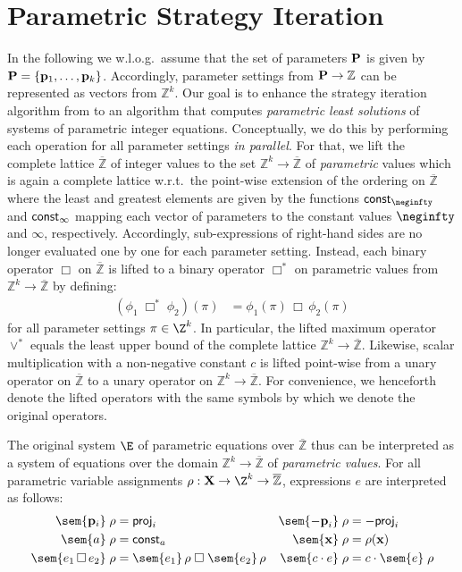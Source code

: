 \documentclass[a4paper]{easychair}
\newcommand{\ZZ}{\mathbb{Z}}
\newcommand{\ZzZ}{\overline{\mathbb Z}}
\newcommand{\us}{\cite{Gawlitza07PreciseFix,DBLP:conf/fm/GawlitzaS08,EasyChair:235}\xspace}
\begin{document}
\section{Parametric Strategy Iteration}\label{s:psi}

In the following we w.l.o.g.\ assume that the set of parameters ${\bf P}$ is given by 
${\bf P} = \{{\bf p}_1,\ldots,{\bf p}_k\}$. 
Accordingly, parameter settings from ${\bf P}\to\ZZ$
can be represented as vectors from $\ZZ^k$.
Our goal is to enhance the strategy iteration algorithm from \us 
to an algorithm 
that computes \emph{parametric least solutions} of systems of parametric integer equations.
Conceptually, we do this by performing each operation for all parameter settings \emph{in parallel}.
For that, we lift the complete lattice $\ZzZ$ of integer values to the set $\ZZ^k\to\ZzZ$
of \emph{parametric} values which is again a complete lattice w.r.t.\
the point-wise extension of the ordering on $\ZzZ$
where the least and greatest elements are given by the functions ${\sf const}_{\neginfty}$ and
${\sf const}_\infty$ mapping each vector of parameters to the constant values $\neginfty$ and $\infty$, respectively.
Accordingly, sub-expressions of right-hand sides are no longer evaluated one by one for each parameter setting.
Instead, each binary operator $\Box$ on $\ZzZ$
is lifted to a binary operator $\Box^*$ on parametric values from $\ZZ^k \to\ZzZ$ 
by defining:
\begin{align*}
  (\phi_1\;\Box^*\;\phi_2)(\pi) &= \phi_1(\pi)\,\Box\,\phi_2(\pi) 
\end{align*}
\noindent
for all parameter settings $\pi \in \Z^k$.
In particular, the lifted maximum operator $\vee^*$ 
equals the least upper bound of the complete lattice $\ZZ^k \to\ZzZ$.
Likewise, scalar multiplication with a non-negative constant $c$ is lifted point-wise from a unary
operator on $\ZzZ$ to a unary operator on $\ZZ^k \to\ZzZ$.
For convenience, we henceforth denote the lifted operators with the same symbols by which we denote the
original operators.

The original system $\E$ of parametric equations over $\ZzZ$ thus can be interpreted as
a system of equations over the domain $\ZZ^k\to\ZzZ$ of \emph{parametric values}. 
For all parametric variable assignments $\rho : {\bf X} \to \Z^k \to \ZzZ$,
expressions $e$ are interpreted as follows:
\begin{align*}
\sem{{\bf p}_i}\;\rho &= {\sf proj}_i	&
\sem{{\bf -p}_i}\;\rho &= {\sf -proj}_i	\\
\sem{a}\;\rho  &= {\sf const}_a   &
\sem{{\bf x}}\;\rho &= \rho({\bf x})  \\
\sem{e_1\,\Box\,e_2}\;\rho &= \sem{e_1}\,\rho\;\Box\;\sem{e_2}\,\rho  &
\sem{c\cdot e}\;\rho &= c\cdot\sem{e}\;\rho    
\end{align*}
\end{document}
